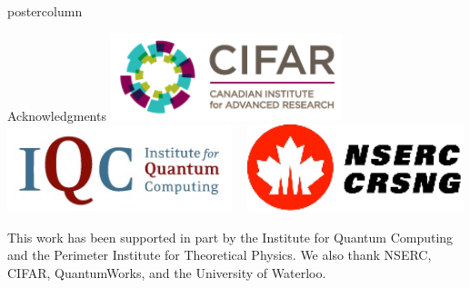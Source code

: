 \documentclass[final]{beamer} %
\begin{document}
\begin{frame}{}
\begin{columns}
\begin{column}{.33\textwidth}
\begin{beamercolorbox}[center,wd=\textwidth]{postercolumn}
\begin{minipage}[T]{.95\textwidth}
           \begin{block}{\large Acknowledgments}
             \centering 
             \includegraphics[height=1in]{figures/CIFAR_Logo.png} \ \ \includegraphics[height=1in]{figures/IQC_Logo.png}  \ \ \includegraphics[height=1in]{figures/NSERC_Logo.png}

            This work has been supported in part by the Institute for Quantum Computing and the Perimeter Institute for Theoretical Physics. We also thank NSERC, CIFAR, QuantumWorks, and the University of Waterloo.


\end{block}
\end{minipage}
\end{beamercolorbox}
\end{column}
\end{columns}
\end{frame}
\end{document}
